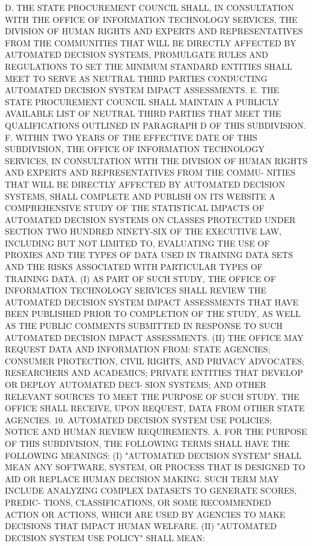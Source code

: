    D.  THE  STATE  PROCUREMENT  COUNCIL  SHALL,  IN CONSULTATION WITH THE
 OFFICE OF INFORMATION TECHNOLOGY SERVICES, THE DIVISION OF HUMAN  RIGHTS
 AND  EXPERTS  AND  REPRESENTATIVES  FROM  THE  COMMUNITIES  THAT WILL BE
 DIRECTLY AFFECTED BY AUTOMATED DECISION SYSTEMS,  PROMULGATE  RULES  AND
 REGULATIONS  TO SET THE MINIMUM STANDARD ENTITIES SHALL MEET TO SERVE AS
 NEUTRAL  THIRD  PARTIES  CONDUCTING  AUTOMATED  DECISION  SYSTEM  IMPACT
 ASSESSMENTS.
   E.  THE  STATE PROCUREMENT COUNCIL SHALL MAINTAIN A PUBLICLY AVAILABLE
 LIST OF NEUTRAL THIRD PARTIES THAT MEET THE QUALIFICATIONS  OUTLINED  IN
 PARAGRAPH D OF THIS SUBDIVISION.
   F.  WITHIN  TWO  YEARS  OF THE EFFECTIVE DATE OF THIS SUBDIVISION, THE
 OFFICE OF INFORMATION TECHNOLOGY  SERVICES,  IN  CONSULTATION  WITH  THE
 DIVISION OF HUMAN RIGHTS AND EXPERTS AND REPRESENTATIVES FROM THE COMMU-
 NITIES  THAT  WILL  BE  DIRECTLY AFFECTED BY AUTOMATED DECISION SYSTEMS,
 SHALL COMPLETE AND PUBLISH ON ITS WEBSITE A COMPREHENSIVE STUDY  OF  THE
 STATISTICAL  IMPACTS  OF AUTOMATED DECISION SYSTEMS ON CLASSES PROTECTED
 UNDER SECTION TWO HUNDRED NINETY-SIX OF THE EXECUTIVE LAW, INCLUDING BUT
 NOT LIMITED TO, EVALUATING THE USE OF PROXIES AND THE TYPES OF DATA USED
 IN TRAINING DATA SETS AND THE RISKS ASSOCIATED WITH PARTICULAR TYPES  OF
 TRAINING DATA.
   (I)  AS  PART  OF  SUCH  STUDY,  THE  OFFICE OF INFORMATION TECHNOLOGY
 SERVICES SHALL REVIEW THE AUTOMATED DECISION SYSTEM  IMPACT  ASSESSMENTS
 THAT  HAVE  BEEN  PUBLISHED PRIOR TO COMPLETION OF THE STUDY, AS WELL AS
 THE PUBLIC COMMENTS SUBMITTED IN RESPONSE  TO  SUCH  AUTOMATED  DECISION
 IMPACT ASSESSMENTS.
   (II) THE OFFICE MAY REQUEST DATA AND INFORMATION FROM: STATE AGENCIES;
 CONSUMER  PROTECTION,  CIVIL  RIGHTS, AND PRIVACY ADVOCATES; RESEARCHERS
 AND ACADEMICS; PRIVATE ENTITIES THAT DEVELOP OR DEPLOY  AUTOMATED  DECI-
 SION  SYSTEMS;  AND  OTHER  RELEVANT SOURCES TO MEET THE PURPOSE OF SUCH
 STUDY. THE OFFICE SHALL RECEIVE, UPON REQUEST,  DATA  FROM  OTHER  STATE
 AGENCIES.
   10.  AUTOMATED  DECISION  SYSTEM USE POLICIES; NOTICE AND HUMAN REVIEW
 REQUIREMENTS.
   A. FOR THE PURPOSE OF THIS SUBDIVISION, THE FOLLOWING TERMS SHALL HAVE
 THE FOLLOWING MEANINGS:
   (I) "AUTOMATED DECISION SYSTEM" SHALL MEAN ANY  SOFTWARE,  SYSTEM,  OR
 PROCESS  THAT  IS DESIGNED TO AID OR REPLACE HUMAN DECISION MAKING. SUCH
 TERM MAY INCLUDE ANALYZING COMPLEX DATASETS TO GENERATE SCORES,  PREDIC-
 TIONS, CLASSIFICATIONS, OR SOME RECOMMENDED ACTION OR ACTIONS, WHICH ARE
 USED BY AGENCIES TO MAKE DECISIONS THAT IMPACT HUMAN WELFARE.
   (II) "AUTOMATED DECISION SYSTEM USE POLICY" SHALL MEAN:
